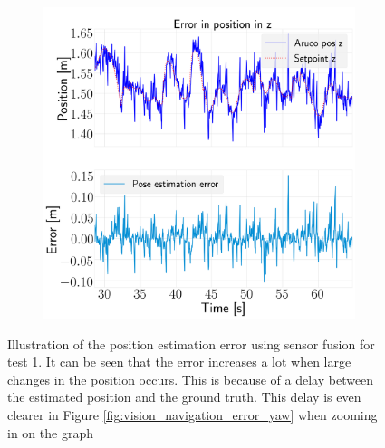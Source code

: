 \documentclass[../Head/report.tex]{subfiles}
\begin{document}
\begin{figure}[H]
\begin{subfigure}[t]{.30\textwidth}
        \caption{}
        \label{fig:vision_navigation_error_y}
    \end{subfigure}
     \hspace{0.2em}
    \begin{subfigure}[t]{.30\textwidth}
        \centering
        \includegraphics[width=\textwidth]{../Figures/vision_navigation/test1_full_pattern_board/error_z/pose_error_z_test1.png}
        \caption{}
        \label{fig:vision_navigation_error_z}
    \end{subfigure}
    \caption{Illustration of the position estimation error using sensor fusion for test 1. It can be seen that the error increases a lot when large changes in the position occurs. This is because of a delay between the estimated position and the ground truth. This delay is even clearer in Figure \ref{fig:vision_navigation_error_yaw} when zooming in on the graph}
    \label{fig:vision_navigation_error_pos}
\end{figure}
\end{document}
